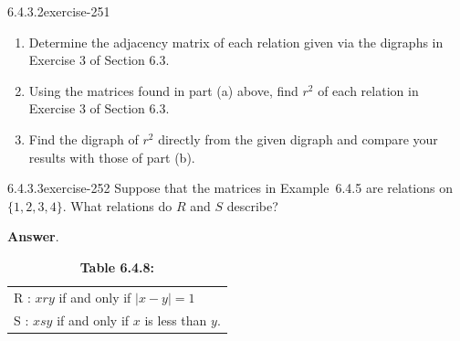 \documentclass[twoside,10pt,]{book}
\numberwithin{equation}{section}
\begin{document}
\begin{divisionsolution}{6.4.3.2}{}{exercise-251}%
\hypertarget{p-2147}{}%
\leavevmode%
\begin{enumerate}[label=(\alph*)]
\item\hypertarget{li-1136}{}\hypertarget{p-2148}{}%
Determine the adjacency matrix of each relation given via the digraphs in Exercise 3 of Section 6.3.%
\item\hypertarget{li-1137}{}\hypertarget{p-2149}{}%
Using the matrices found in part (a) above, find \(r^2\) of each relation in Exercise 3 of Section 6.3.%
\item\hypertarget{li-1138}{}\hypertarget{p-2150}{}%
Find the digraph of \(r^2\) directly from the given digraph and compare your results with those of part (b).%
\end{enumerate}
%
\end{divisionsolution}%
\begin{divisionsolution}{6.4.3.3}{}{exercise-252}%
\hypertarget{p-2151}{}%
Suppose that the matrices in Example~6.4.5 are relations on \(\{1, 2, 3, 4\}\). What relations do \(R\) and \(S\) describe?%
\par\smallskip%
\noindent\textbf{Answer}.\quad%
\leavevmode%
\begin{table}
\centering
\begin{tabular}{l}
R : \(x r y\) if and only if \(\lvert x -y \rvert = 1\)\tabularnewline[0pt]
S : \(x s y\) if and only if \(x\) is less than \(y\).
\end{tabular}
\caption*{\textbf{Table 6.4.8:} }
\end{table}
\end{divisionsolution}%
\end{document}
